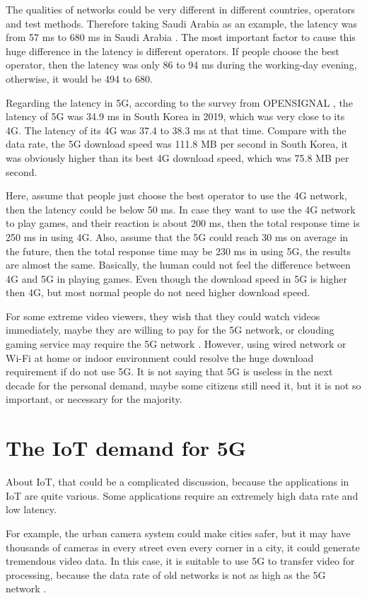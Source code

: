 \documentclass[conference]{IEEEtran}
\begin{document}
The qualities of networks could be very different in different countries, operators and test methods. Therefore taking Saudi Arabia as an example, the latency was from 57 ms to 680 ms in Saudi Arabia \cite{8}. The most important factor to cause this huge difference in the latency is different operators. If people choose the best operator, then the latency was only 86 to 94 ms during the working-day evening, otherwise, it would be 494 to 680.

Regarding the latency in 5G, according to the survey from OPENSIGNAL \cite{9}, the latency of 5G was 34.9 ms in South Korea in 2019, which was very close to its 4G. The latency of its 4G was 37.4 to 38.3 ms at that time. Compare with the data rate, the 5G download speed was 111.8 MB per second in South Korea, it was obviously higher than its best 4G download speed, which was 75.8 MB per second.

Here, assume that people just choose the best operator to use the 4G network, then the latency could be below 50 ms. In case they want to use the 4G network to play games, and their reaction is about 200 ms, then the total response time is 250 ms in using 4G. Also, assume that the 5G could reach 30 ms on average in the future, then the total response time may be 230 ms in using 5G, the results are almost the same. Basically, the human could not feel the difference between 4G and 5G in playing games. Even though the download speed in 5G is higher then 4G, but most normal people do not need higher download speed.

For some extreme video viewers, they wish that they could watch videos immediately, maybe they are willing to pay for the 5G network, or clouding gaming service may require the 5G network \cite{10}. However, using wired network or Wi-Fi at home or indoor environment could resolve the huge download requirement if do not use 5G. It is not saying that 5G is useless in the next decade for the personal demand, maybe some citizens still need it, but it is not so important, or necessary for the majority.

\section{The IoT demand for 5G}
About IoT, that could be a complicated discussion, because the applications in IoT are quite various. Some applications require an extremely high data rate and low latency.

For example, the urban camera system could make cities safer, but it may have thousands of cameras in every street even every corner in a city, it could generate tremendous video data. In this case, it is suitable to use 5G to transfer video for processing, because the data rate of old networks is not as high as the 5G network  \cite{11}. 
\end{document}
